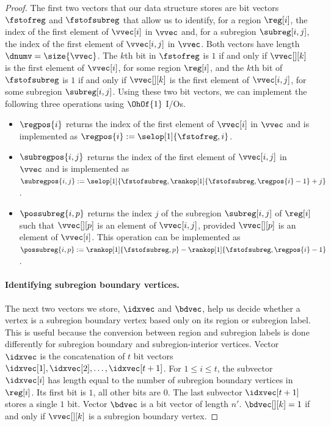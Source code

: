 \begin{proof}
  The first two vectors that our data structure stores are bit vectors
  $\fstofreg$ and $\fstofsubreg$ that
  allow us to identify, for a region $\reg[i]$, the index of the first
  element of $\vvec[i]$ in $\vvec$ and, for a subregion $\subreg[i,j]$,
  the index of the first element of $\vvec[i,j]$ in $\vvec$.
  Both vectors have length $\dnumv = \size{\vvec}$.
  The $k$th bit in $\fstofreg$ is $1$ if and only if $\vvec[][k]$ is the
  first element of $\vvec[i]$, for some region $\reg[i]$,
  and the $k$th bit of $\fstofsubreg$ is $1$
  if and only if $\vvec[][k]$ is the first element of $\vvec[i,j]$, for some
  subregion $\subreg[i,j]$.
  Using these two bit vectors, we can implement the following three operations
  using $\OhOf{1}$ I/Os.
  \begin{itemize}
  \item $\regpos{i}$ returns the index of the first element of $\vvec[i]$
    in $\vvec$ and is implemented as $\regpos{i} := \selop[1]{\fstofreg,i}$.
  \item $\subregpos{i,j}$ returns the index of the first element of $\vvec[i,j]$
    in $\vvec$ and is implemented as
    $\subregpos{i,j} := \selop[1]{\fstofsubreg,\rankop[1]{\fstofsubreg,\regpos{i}-1}+j}$.
  \item $\possubreg{i,p}$ returns the index $j$ of the subregion $\subreg[i,j]$
    of $\reg[i]$ such that $\vvec[][p]$ is an element of  $\vvec[i,j]$,
    provided $\vvec[][p]$ is an element of $\vvec[i]$.
    This operation can be implemented as
    $\possubreg{i,p} := \rankop[1]{\fstofsubreg,p} - \rankop[1]{\fstofsubreg,
      \regpos{i} - 1}$.
  \end{itemize}

  \paragraph{Identifying subregion boundary vertices.}

  The next two vectors we store, $\idxvec$ and $\bdvec$, help us decide whether
  a vertex is a subregion boundary vertex based only on its region or subregion
  label.
  This is useful because the conversion between region and subregion
  labels is done differently for subregion boundary and subregion-interior
  vertices.
  Vector $\idxvec$ is the concatenation of $t$ bit vectors
  $\idxvec[1], \idxvec[2], \dots, \idxvec[t+1]$.
  For $1 \le i \le t$, the subvector $\idxvec[i]$ has length equal to the
  number of subregion boundary vertices in $\reg[i]$.
  Its first bit is $1$, all other bits are $0$.
  The last subvector $\idxvec[t+1]$ stores a single $1$ bit.
  Vector $\bdvec$ is a bit vector of length $n'$.
  $\bdvec[][k] = 1$ if and only if $\vvec[][k]$ is a subregion boundary
  vertex.


\end{proof}
